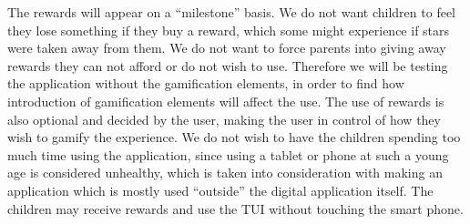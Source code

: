 The rewards will appear on a ``milestone'' basis. We do not want children to feel they lose something if they buy a reward, which some might experience if stars were taken away from them. We do not want to force parents into giving away rewards they can not afford or do not wish to use. Therefore we will be testing the application without the gamification elements, in order to find how introduction of gamification elements will affect the use. The use of rewards is also optional and decided by the user, making the user in control of how they wish to gamify the experience. 
We do not wish to have the children spending too much time using the application, since using a tablet or phone at such a young age is considered unhealthy, which is taken into consideration with making an application which is mostly used ``outside'' the digital application itself. The children may receive rewards and use the TUI without touching the smart phone.

